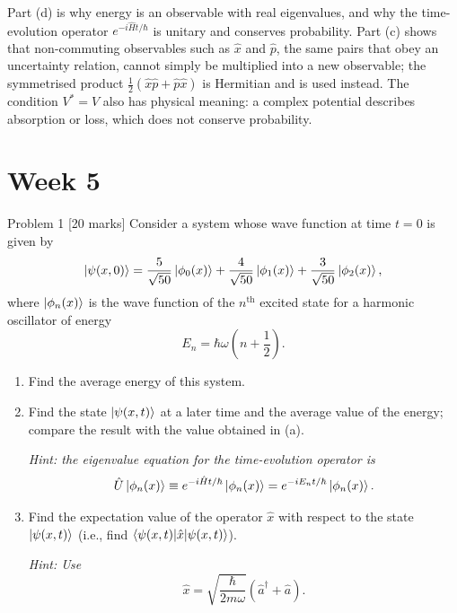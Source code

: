 \documentclass[12pt]{article}
\begin{document}
\begin{insightbox}
Part (d) is why energy is an observable with real eigenvalues, and why the time-evolution operator $e^{-i\hat Ht/\hbar}$ is unitary and conserves probability. Part (c) shows that non-commuting observables such as $\hat x$ and $\hat p$, the same pairs that obey an uncertainty relation, cannot simply be multiplied into a new observable; the symmetrised product $\frac12(\hat x\hat p+\hat p\hat x)$ is Hermitian and is used instead. The condition $V^*=V$ also has physical meaning: a complex potential describes absorption or loss, which does not conserve probability.
\end{insightbox}
\fi


\newpage
\section{Week 5}

\begin{problembox}{Problem 1 \hfill [20 marks]}
Consider a system whose wave function at time $t=0$ is given by
\[
\ket{\psi(x,0)}=
\frac{5}{\sqrt{50}}\ket{\phi_0(x)}
+\frac{4}{\sqrt{50}}\ket{\phi_1(x)}
+\frac{3}{\sqrt{50}}\ket{\phi_2(x)},
\]
where $\ket{\phi_n(x)}$ is the wave function of the $n^{\mathrm{th}}$ excited state for a harmonic oscillator of energy
\[
E_n=\hbar\omega\left(n+\frac{1}{2}\right).
\]

\begin{enumerate}
    \item Find the average energy of this system.
    \item Find the state $\ket{\psi(x,t)}$ at a later time and the average value of the energy; compare the result with the value obtained in (a).

    \textit{Hint: the eigenvalue equation for the time-evolution operator is}
    \[
    \hat{U}\ket{\phi_n(x)}\equiv e^{-i\hat{H}t/\hbar}\ket{\phi_n(x)}
    =e^{-iE_nt/\hbar}\ket{\phi_n(x)}.
    \]

    \item Find the expectation value of the operator $\hat{x}$ with respect to the state $\ket{\psi(x,t)}$ (i.e., find $\braket{\psi(x,t)|\hat{x}|\psi(x,t)}$).

    \textit{Hint: Use}
    \[
    \hat{x}=\sqrt{\frac{\hbar}{2m\omega}}\left(\hat{a}^{\dagger}+\hat{a}\right).
    \]
\end{enumerate}
\end{problembox}
\end{document}

